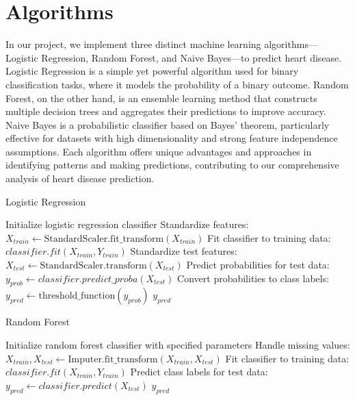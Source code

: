 \section{Algorithms}
In our project, we implement three distinct machine learning algorithms—Logistic Regression, Random Forest, and Naive Bayes—to predict heart disease. Logistic Regression is a simple yet powerful algorithm used for binary classification tasks, where it models the probability of a binary outcome. Random Forest, on the other hand, is an ensemble learning method that constructs multiple decision trees and aggregates their predictions to improve accuracy. Naive Bayes is a probabilistic classifier based on Bayes' theorem, particularly effective for datasets with high dimensionality and strong feature independence assumptions. Each algorithm offers unique advantages and approaches in identifying patterns and making predictions, contributing to our comprehensive analysis of heart disease prediction.

\begin{algorithm}
    \caption{Logistic Regression}
    \label{algo:logistic_regression}
    \begin{algorithmic}[1]
        \Statex
        \State Initialize logistic regression classifier
        \State Standardize features: $X_{train} \gets \text{StandardScaler.fit\_transform}(X_{train})$
        \State Fit classifier to training data: $classifier.fit(X_{train}, Y_{train})$
        \State Standardize test features: $X_{test} \gets \text{StandardScaler.transform}(X_{test})$
        \State Predict probabilities for test data: $y_{prob} \gets classifier.predict\_proba(X_{test})$
        \State Convert probabilities to class labels: $y_{pred} \gets \text{threshold\_function}(y_{prob})$
        \State \Return $y_{pred}$
        \EndFunction
    \end{algorithmic}
\end{algorithm}

\begin{algorithm}
    \caption{Random Forest}
    \label{algo:random_forest}
    \begin{algorithmic}[1]
        \Statex
        \State Initialize random forest classifier with specified parameters
        \State Handle missing values: $X_{train}, X_{test} \gets \text{Imputer.fit\_transform}(X_{train}, X_{test})$
        \State Fit classifier to training data: $classifier.fit(X_{train}, Y_{train})$
        \State Predict class labels for test data: $y_{pred} \gets classifier.predict(X_{test})$
        \State \Return $y_{pred}$
        \EndFunction
    \end{algorithmic}
\end{algorithm}

